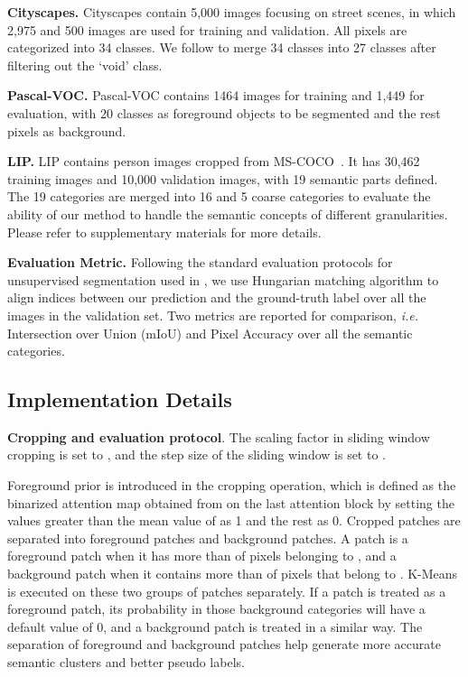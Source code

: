 \documentclass[runningheads]{llncs}
\def\ie{\emph{i.e. }}
\newcommand{\PAR}[1]{\smallskip \noindent \textbf{#1}}
\begin{document}
\PAR{Cityscapes.} Cityscapes contain 5,000 images focusing on street scenes, in which 2,975 and 500 images are used for training and validation. All pixels are categorized into 34 classes. We follow \cite{PiCIE} to merge 34 classes into 27 classes after filtering out the `void' class.

\PAR{Pascal-VOC.} Pascal-VOC contains 1464 images for training and 1,449 for evaluation, with 20 classes as foreground objects to be segmented and the rest pixels as background. 

\PAR{LIP.} LIP contains person images cropped from MS-COCO~\cite{lin2014mscoco}. It has 30,462 training images and 10,000 validation images, with 19 semantic parts defined. The 19 categories are merged into 16 and 5 coarse categories to evaluate the ability of our method to handle the semantic concepts of different granularities. Please refer to supplementary materials for more details.


\PAR{Evaluation Metric.} Following the standard evaluation protocols for unsupervised segmentation used in \cite{IIC,PiCIE,MaskContrast}, we use Hungarian matching algorithm to align indices between our prediction and the ground-truth label over all the images in the validation set. Two metrics are reported for comparison, \ie Intersection over Union (mIoU) and Pixel Accuracy over all the semantic categories.


\subsection{Implementation Details} 

\PAR{Cropping and evaluation protocol}. The scaling factor  in sliding window cropping is set to , and the step size of the sliding window is set to . 

Foreground prior is introduced in the cropping operation, which is defined as the binarized attention map  obtained from  on the last attention block by setting the values greater than the mean value of  as 1 and the rest as 0. Cropped patches are separated into foreground patches and background patches. A patch is a foreground patch when it has more than  of pixels belonging to , and a background patch when it contains more than  of pixels that belong to . K-Means is executed on these two groups of patches separately. If a patch is treated as a foreground patch, its probability in those background categories will have a default value of 0, and a background patch is treated in a similar way.
The separation of foreground and background patches help generate more accurate semantic clusters and better pseudo labels. 
\end{document}
